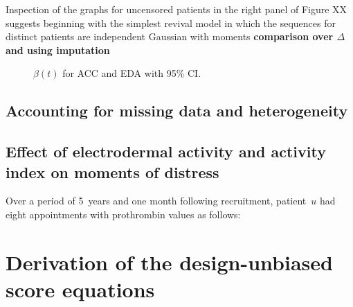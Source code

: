 \documentclass[11pt]{amsart}
\begin{document}
Inspection of the graphs for uncensored patients in the right panel of Figure XX suggests beginning with the simplest revival model in which the sequences
for distinct patients are independent Gaussian with moments {\bf comparison over $\Delta$ and using imputation}

\begin{figure}[!th]
\caption{$\beta (t)$ for ACC and EDA with 95\% CI.}
\end{figure}

\subsection{Accounting for missing data and heterogeneity}

\subsection{Effect of electrodermal activity and activity index on moments of distress}

Over a period of 5~years and one month following recruitment,
patient~$u$ had eight appointments with prothrombin values as follows:




\newpage
\appendix

\section{Derivation of the design-unbiased score equations}
\end{document}
